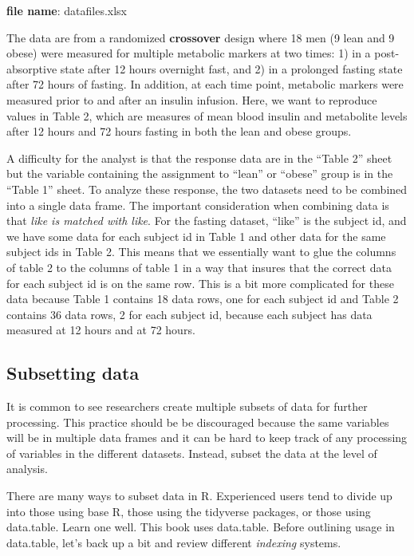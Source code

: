 \documentclass[]{book}
\begin{document}
\textbf{file name}: datafiles.xlsx

The data are from a randomized \textbf{crossover} design where 18 men (9 lean and 9 obese) were measured for multiple metabolic markers at two times: 1) in a post-absorptive state after 12 hours overnight fast, and 2) in a prolonged fasting state after 72 hours of fasting. In addition, at each time point, metabolic markers were measured prior to and after an insulin infusion. Here, we want to reproduce values in Table 2, which are measures of mean blood insulin and metabolite levels after 12 hours and 72 hours fasting in both the lean and obese groups.

A difficulty for the analyst is that the response data are in the ``Table 2'' sheet but the variable containing the assignment to ``lean'' or ``obese'' group is in the ``Table 1'' sheet. To analyze these response, the two datasets need to be combined into a single data frame. The important consideration when combining data is that \emph{like is matched with like}. For the fasting dataset, ``like'' is the subject id, and we have some data for each subject id in Table 1 and other data for the same subject ids in Table 2. This means that we essentially want to glue the columns of table 2 to the columns of table 1 in a way that insures that the correct data for each subject id is on the same row. This is a bit more complicated for these data because Table 1 contains 18 data rows, one for each subject id and Table 2 contains 36 data rows, 2 for each subject id, because each subject has data measured at 12 hours and at 72 hours.

\hypertarget{subsetting-data}{%
\subsection{Subsetting data}\label{subsetting-data}}

It is common to see researchers create multiple subsets of data for further processing. This practice should be be discouraged because the same variables will be in multiple data frames and it can be hard to keep track of any processing of variables in the different datasets. Instead, subset the data at the level of analysis.

There are many ways to subset data in R. Experienced users tend to divide up into those using base R, those using the tidyverse packages, or those using data.table. Learn one well. This book uses data.table. Before outlining usage in data.table, let's back up a bit and review different \emph{indexing} systems.
\end{document}
